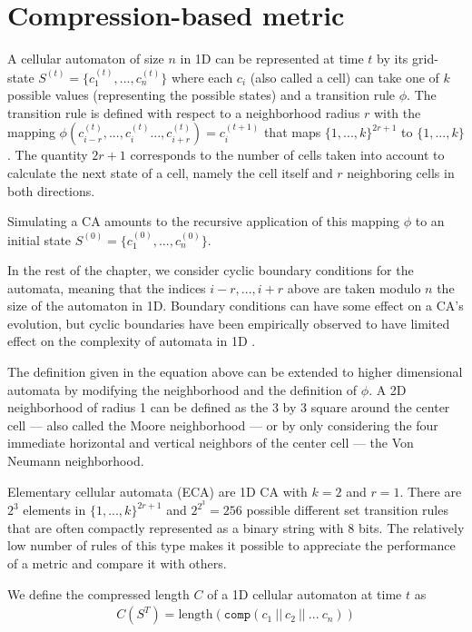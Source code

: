 \section{Compression-based metric}\label{sec:compr-based-metr}

A cellular automaton of size $n$ in 1D can be represented at time $t$ by its
grid-state $S^{(t)} = \{c_1^{(t)}, ..., c_n^{(t)}\}$ where each $c_i$ (also
called a cell) can take one of $k$ possible values (representing the possible
states) and a transition rule $\phi$. The transition rule is defined with
respect to a neighborhood radius $r$ with the mapping $\phi(c^{(t)}_{i-r}, ...,
c^{(t)}_i ..., c^{(t)}_{i+r} ) = c^{(t+1)}_i$ that maps $\{1, ..., k\}^{2r+1}$
to $\{1, ..., k\}$. The quantity $2r + 1$ corresponds to the number of
cells taken into account to calculate the next state of a cell, namely the
cell itself and $r$ neighboring cells in both directions.

Simulating a CA amounts to the recursive application of this mapping $\phi$ to
an initial state $S^{(0)} = \{c_1^{(0)}, ..., c_n^{(0)}\}$.

In the rest of the chapter, we consider cyclic boundary conditions for the
automata, meaning that the indices $i-r, ..., i+r$ above are taken modulo $n$
the size of the automaton in 1D. Boundary conditions can have some effect on a
CA's evolution, but cyclic boundaries have been empirically observed to have
limited effect on the complexity of automata in 1D
\parencite{luvalleEffectsBoundaryConditions2019}.

The definition given in the equation above can be extended to higher dimensional
automata by modifying the neighborhood and the definition of $\phi$. A 2D
neighborhood of radius 1 can be defined as the 3 by 3 square around the center
cell --- also called the Moore neighborhood --- or by only considering the four
immediate horizontal and vertical neighbors of the center cell --- the Von Neumann
neighborhood.

Elementary cellular automata (ECA) are 1D CA with $k = 2$ and $r = 1$. There are
$2^3$ elements in $\{1, ..., k\}^{2r+1}$ and $2^{2^3} = 256$ possible different
set transition rules that are often compactly represented as a binary string
with 8 bits. The relatively low number of rules of this type makes it possible
to appreciate the performance of a metric and compare it with others.

We define the compressed length $C$ of a 1D cellular automaton at time $t$ as
\begin{align}
  C(S^{T}) = \text{length}\left(\texttt{comp}(c_1\ ||\ c_2\ ||\ ...\ c_n)\right)
\end{align}

